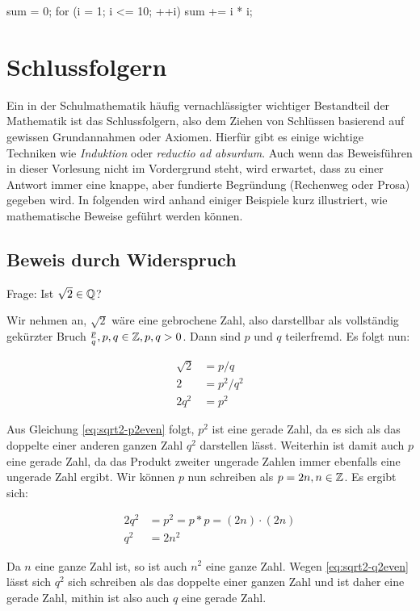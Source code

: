 \begin{jscode}
sum = 0;
for (i = 1; i <= 10; ++i)
	sum += i * i;
\end{jscode}

\section{Schlussfolgern}

Ein in der Schulmathematik häufig vernachlässigter wichtiger Bestandteil der Mathematik ist das Schlussfolgern, also dem Ziehen von Schlüssen basierend auf gewissen Grundannahmen oder Axiomen. Hierfür
gibt es einige wichtige Techniken wie \emph{Induktion} oder \emph{reductio ad absurdum}. Auch wenn das Beweisführen in dieser Vorlesung nicht im Vordergrund steht, wird erwartet, dass zu einer Antwort
immer eine knappe, aber fundierte Begründung (Rechenweg oder Prosa) gegeben wird. In folgenden wird anhand einiger Beispiele kurz illustriert, wie mathematische Beweise geführt werden können.

\subsection{Beweis durch Widerspruch}

Frage: Ist $\sqrt{2}\in\mathbb{Q}$?

Wir nehmen an, $\sqrt{2}$ wäre eine gebrochene Zahl, also darstellbar als vollständig gekürzter Bruch $\frac{p}{q}, p,q\in\mathbb{Z}, p,q>0$. Dann sind $p$ und $q$ teilerfremd. Es folgt nun:

\begin{align}
  \sqrt{2} & = p / q \\
         2 & = p^2 / q^2 \\
     2 q^2 & = p^2 \label{eq:sqrt2-p2even}
\end{align}

Aus Gleichung \ref{eq:sqrt2-p2even} folgt, $p^2$ ist eine gerade Zahl, da es sich als das doppelte einer anderen ganzen Zahl $q^2$ darstellen lässt. Weiterhin ist damit auch $p$ eine gerade Zahl, da das Produkt zweiter ungerade Zahlen
immer ebenfalls eine ungerade Zahl ergibt. Wir können $p$ nun schreiben als $p = 2 n, n\in \mathbb{Z}$. Es ergibt sich:

\begin{align}
	2q^2 & = p^2 = p * p = (2n) \cdot (2n) \\
	q^2 & = 2 n^2 \label{eq:sqrt2-q2even}
\end{align}

Da $n$ eine ganze Zahl ist, so ist auch $n^2$ eine ganze Zahl. Wegen \ref{eq:sqrt2-q2even} lässt sich $q^2$ sich schreiben als das doppelte einer ganzen Zahl und ist daher eine gerade Zahl, mithin ist also auch $q$ eine gerade Zahl.

